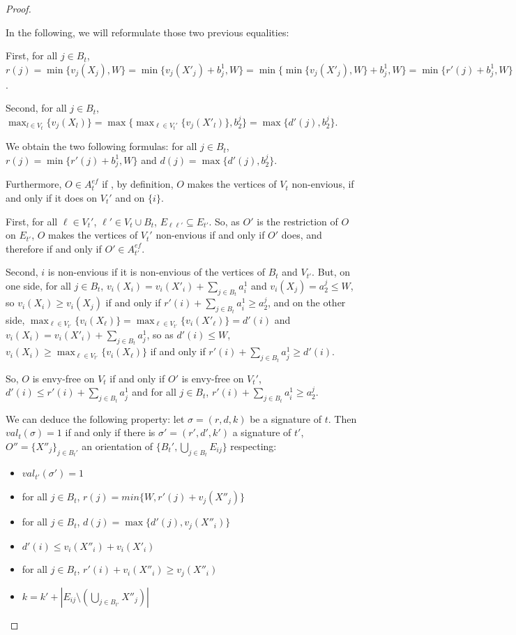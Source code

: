 \begin{proof}
\begin{nestedproof}
    In the following, we will reformulate those two previous equalities:

    First, for all $j\in B_t$, $r(j)=\min\{v_{j}(X_{j}),W\}=\min\{v_{j}(X'_{j})+b_j^1,W\}=\min\{\min\{v_j(X'_j),W\}+b_j^1,W\}=\min\{r'(j)+b_j^1,W\}$.

    Second, for all $j\in B_t$, $\max_{l\in V_t}\{v_j(X_l)\}=\max\{\max_{\ell\in V_t'}\{v_j(X'_l)\},b_2^j\}=\max\{d'(j),b_2^j\}$.

    We obtain the two following formulas: for all $j\in B_t$, $r(j)=\min\{r'(j)+b_j^1,W\}$ and $d(j)=\max\{d'(j),b_2^j\}$.

    Furthermore, $O\in A_t^{ef}$ if , by definition, $O$ makes the vertices of $V_t$ non-envious, if and only if it does on $V_t'$ and on $\{i\}$.

    First, for all $\ell\in V_t'$, $\ell'\in V_t\cup B_t$, $E_{\ell\ell'}\subseteq E_{t'}$. So, as $O'$ is the restriction of $O$ on $E_{t'}$, $O$ makes the vertices of $V_t'$ non-envious if and only if $O'$ does, and therefore if and only if $O'\in A_{t'}^{ef}$.

    Second, $i$ is non-envious if it is non-envious of the vertices of $B_t$ and $V_{t'}$. But, on one side, for all $j\in B_t$, $v_i(X_i)=v_i(X'_i)+\sum_{j\in B_t}a_i^1$ and $v_i(X_j)=a_2^j\leq W$, so $v_i(X_i)\geq v_i(X_j)$ if and only if $r'(i)+\sum_{j\in B_t}a_i^1\geq a_2^j$,
    and on the other side, $\max_{\ell\in V_{t'}}\{v_i(X_\ell)\}=\max_{\ell\in V_{t'}}\{v_i(X'_\ell)\}=d'(i)$ and $v_i(X_i)= v_i(X'_i)+\sum_{j\in B_t}a_j^1$, so as $d'(i)\leq W$,  $v_i(X_i)\geq \max_{\ell\in V_{t'}}\{v_i(X_\ell)\}$ if and only if $r'(i)+\sum_{j\in B_t}a_j^1\geq d'(i)$.

    So, $O$ is envy-free on $V_t$ if and only if $O'$ is envy-free on $V_t'$, $d'(i)\leq r'(i)+\sum_{j\in B_t}a_j^1$ and for all $j\in B_t$, $r'(i)+\sum_{j\in B_t}a_i^1\geq a_2^j$.

    We can deduce the following property: let $\sigma=(r,d,k)$ be a signature of $t$. Then $val_t(\sigma)=1$ if and only if there is $\sigma'=(r',d',k')$ a signature of $t'$, $O''=\{X''_j\}_{j\in B_t'}$ an orientation of $\{B_t',\bigcup_{j\in B_t}E_{ij}\}$ respecting:
    \begin{itemize}
        \item $val_{t'}(\sigma')=1$
        \item for all $j\in B_t$, $r(j)=min\{W,r'(j)+v_j(X''_j)\}$
        \item for all $j\in B_t$, $d(j)= \max\{d'(j),v_j(X''_i)\}$
        \item $d'(i)\leq v_i(X''_i)+v_i(X'_i)$
        \item for all $j\in B_t$, $r'(i)+v_i(X''_i)\geq v_j(X''_i)$
        \item $k=k'+ |E_{ij}\setminus (\bigcup_{j\in B_{t'}}X''_j)|$
    \end{itemize}


\end{nestedproof}
\end{proof}
